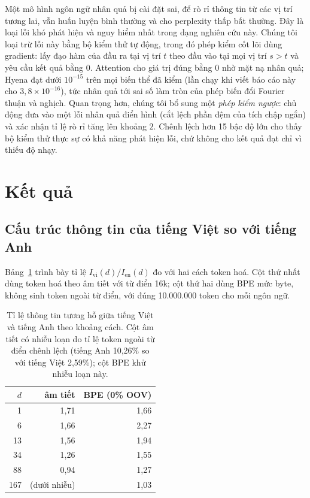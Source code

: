 \documentclass[11pt]{article}
\begin{document}
Một mô hình ngôn ngữ nhân quả bị cài đặt sai, để rò rỉ thông tin từ các vị trí
tương lai, vẫn huấn luyện bình thường và cho perplexity thấp bất thường. Đây là
loại lỗi khó phát hiện và nguy hiểm nhất trong dạng nghiên cứu này. Chúng tôi
loại trừ lỗi này bằng bộ kiểm thử tự động, trong đó phép kiểm cốt lõi dùng
gradient: lấy đạo hàm của đầu ra tại vị trí $t$ theo đầu vào tại mọi vị trí
$s > t$ và yêu cầu kết quả bằng 0. Attention cho giá trị đúng bằng 0 nhờ mặt nạ nhân quả;
Hyena đạt dưới $10^{-15}$ trên mọi biến thể đã kiểm (lần chạy khi viết báo cáo
này cho $3{,}8 \times 10^{-16}$), tức nhân quả tới sai số làm tròn của phép biến
đổi Fourier thuận và nghịch. Quan trọng hơn, chúng tôi bổ sung một \emph{phép kiểm ngược}: chủ động đưa vào
một lỗi nhân quả điển hình (cắt lệch phần đệm của tích chập ngắn) và xác nhận tỉ
lệ rò rỉ tăng lên khoảng $2$. Chênh lệch hơn 15 bậc độ lớn cho thấy bộ kiểm thử
thực sự có khả năng phát hiện lỗi, chứ không cho kết quả đạt chỉ vì thiếu độ
nhạy.

\section{Kết quả}

\subsection{Cấu trúc thông tin của tiếng Việt so với tiếng Anh}

Bảng~\ref{tab:mi} trình bày tỉ lệ $I_{\text{vi}}(d) / I_{\text{en}}(d)$ đo với
hai cách token hoá. Cột thứ nhất dùng token hoá theo âm tiết với từ điển 16k;
cột thứ hai dùng BPE mức byte, không sinh token ngoài từ điển, với đúng
10.000.000 token cho mỗi ngôn ngữ.

\begin{table}[t]
\centering
\small
\begin{tabular}{rrr}
\toprule
$d$ & âm tiết & BPE (0\% OOV) \\
\midrule
1   & 1,71 & 1,66 \\
6   & 1,66 & 2,27 \\
13  & 1,56 & 1,94 \\
34  & 1,26 & 1,55 \\
88  & 0,94 & 1,27 \\
167 & (dưới nhiễu) & 1,03 \\
\bottomrule
\end{tabular}
\caption{Tỉ lệ thông tin tương hỗ giữa tiếng Việt và tiếng Anh theo khoảng
cách. Cột âm tiết có nhiễu loạn do tỉ lệ token ngoài từ điển chênh lệch
(tiếng Anh 10,26\% so với tiếng Việt 2,59\%); cột BPE khử nhiễu loạn này.}
\label{tab:mi}
\end{table}
\end{document}
